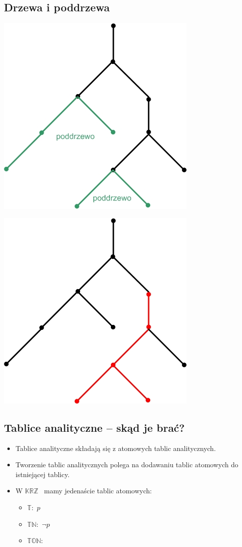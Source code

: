 \documentclass[12pt]{article}
\newcommand {\KRZ} {\ensuremath{\mathbb{KRZ}}}
\begin{document}
\subsection{Drzewa i poddrzewa}
\begin{center}
\includegraphics[width=7 cm]{../pliki_wlasne/drzewo8.jpg}
\end{center}
%

\begin{center}
\includegraphics[width=7 cm]{../pliki_wlasne/drzewo9.jpg}
\end{center}
%

\subsection{Tablice analityczne -- skąd je brać?}
%
\begin{itemize}
\item Tablice analityczne składają się z atomowych tablic analitycznych.
%
\item Tworzenie tablic analitycznych polega na dodawaniu tablic atomowych do istniejącej tablicy.
%
\item W \KRZ~ mamy jedenaście tablic atomowych:
%
\begin{itemize}
\item \label{TA1} $\mathbb{T}$:~$p$
%
\item \label{TA2} $\mathbb{TN}$:~$\neg p$
%
\item \label{TA3} $\mathbb{TON}$: 
\end{itemize}
\end{itemize}
%
\end{document}
